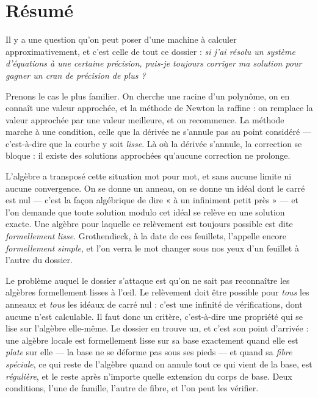 \documentclass[11pt,a4paper]{article}
\begin{document}
\section*{Résumé}

\begin{resume}
Il y a une question qu'on peut poser d'une machine à calculer approximativement,
et c'est celle de tout ce dossier : \emph{si j'ai résolu un système d'équations
à une certaine précision, puis-je toujours corriger ma solution pour gagner un
cran de précision de plus ?}

Prenons le cas le plus familier. On cherche une racine d'un polynôme, on en
connaît une valeur approchée, et la méthode de Newton la raffine : on remplace
la valeur approchée par une valeur meilleure, et on recommence. La méthode
marche à une condition, celle que la dérivée ne s'annule pas au point considéré
— c'est-à-dire que la courbe y soit \emph{lisse}. Là où la dérivée s'annule, la
correction se bloque : il existe des solutions approchées qu'aucune correction
ne prolonge.

L'algèbre a transposé cette situation mot pour mot, et sans aucune limite ni
aucune convergence. On se donne un anneau, on se donne un idéal dont le carré
est nul — c'est la façon algébrique de dire « à un infiniment petit près » — et
l'on demande que toute solution modulo cet idéal se relève en une solution
exacte. Une algèbre pour laquelle ce relèvement est toujours possible est dite
\emph{formellement lisse}. Grothendieck, à la date de ces feuillets, l'appelle
encore \emph{formellement simple}, et l'on verra le mot changer sous nos yeux
d'un feuillet à l'autre du dossier.

Le problème auquel le dossier s'attaque est qu'on ne sait pas reconnaître les
algèbres formellement lisses à l'œil. Le relèvement doit être possible pour
\emph{tous} les anneaux et \emph{tous} les idéaux de carré nul : c'est une
infinité de vérifications, dont aucune n'est calculable. Il faut donc un
critère, c'est-à-dire une propriété qui se lise sur l'algèbre elle-même. Le
dossier en trouve un, et c'est son point d'arrivée : une algèbre locale est
formellement lisse sur sa base exactement quand elle est \emph{plate} sur elle
— la base ne se déforme pas sous ses pieds — et quand sa \emph{fibre spéciale},
ce qui reste de l'algèbre quand on annule tout ce qui vient de la base, est
\emph{régulière}, et le reste après n'importe quelle extension du corps de
base. Deux conditions, l'une de famille, l'autre de fibre, et l'on peut les
vérifier.


\end{resume}
\end{document}
